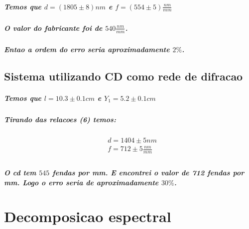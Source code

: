\documentclass[12pt,twoside, a4paper, twocolumn]{article}
\begin{document}
\subparagraph*{Temos que $d = (1805 \pm 8) nm$ e $f = (554 \pm 5) \frac{nm}{mm}$ }

\subparagraph*{O valor do fabricante foi de  $540 \frac{nm}{mm}$.}

\subparagraph*{Entao a ordem do erro seria aproximadamente $2\%$.}

\subsection{Sistema utilizando CD como rede de difracao}

\subparagraph*{Temos que $l = 10.3 \pm 0.1 cm$ e $Y_1 = 5.2 \pm 0.1 cm$}

\subparagraph*{Tirando das relacoes (6) temos:}

\begin{equation}
  \begin{aligned}
     & d = 1404 \pm 5 nm           \\
     & f = 712 \pm 5 \frac{nm}{mm} \\
  \end{aligned}
\end{equation}

\subparagraph*{O cd tem $545$ fendas por mm. E encontrei o valor de 712 fendas por mm. Logo o erro seria de aproximadamente $30\%$.}

\newpage

\section{Decomposicao espectral}
\end{document}
